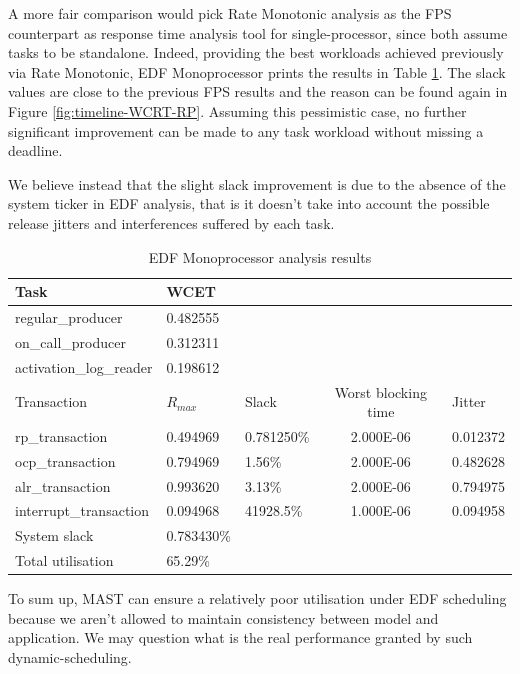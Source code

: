 \documentclass{article}
\begin{document}
A more fair comparison would pick Rate Monotonic analysis as the FPS counterpart as response time analysis tool for single-processor, since both assume tasks to be standalone. Indeed, providing the best workloads achieved previously via Rate Monotonic, EDF Monoprocessor prints the results in Table \ref{tab:EDF-mono-rate-mono}. The slack values are close to the previous FPS results and the reason can be found again in Figure \ref{fig:timeline-WCRT-RP}. Assuming this pessimistic case, no further significant improvement can be made to any task workload without missing a deadline.

We believe instead that the slight slack improvement is due to the absence of the system ticker in EDF analysis, that is it doesn't take into account the possible release jitters and interferences suffered by each task.

\begin{table}[!htbp]
   \centering
   \begin{tabular}{lllcl}
    \toprule
    Task & WCET \\
    \midrule
    regular\_producer & 0.482555     \\
    on\_call\_producer & 0.312311     \\
    activation\_log\_reader & 0.198612 \\
    \toprule
    \toprule
    Transaction & $R_{max}$ & Slack & Worst blocking time & Jitter \\
    \midrule
    rp\_transaction        & 0.494969  & 0.781250\% & 2.000E-06  & 0.012372 \\
    ocp\_transaction       & 0.794969  & 1.56\%     & 2.000E-06  & 0.482628  \\
    alr\_transaction       & 0.993620  & 3.13\%     & 2.000E-06  & 0.794975   \\
    interrupt\_transaction & 0.094968  & 41928.5\%  & 1.000E-06  & 0.094958    \\
    \toprule
    \toprule
    System slack & 0.783430\% \\
    Total utilisation & 65.29\% \\
   \end{tabular}
   \caption{EDF Monoprocessor analysis results}
   \label{tab:EDF-mono-rate-mono}
 \end{table}

To sum up, MAST can ensure a relatively poor utilisation under EDF scheduling because we
aren't allowed to maintain consistency between model and application.
We may question what is the real performance granted by such dynamic-scheduling.
\end{document}
